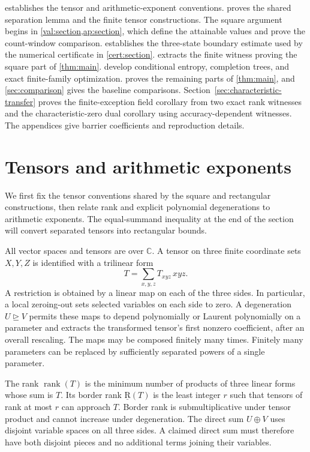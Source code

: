 \documentclass[11pt]{article}
\numberwithin{equation}{section}
\theoremstyle{definition}
\theoremstyle{remark}
\begin{document}
 establishes the tensor and arithmetic-exponent
conventions.   proves the shared separation lemma
and the finite tensor constructions.  The square argument begins in
\cref{val:section,ap:section}, which define the attainable values and
prove the count-window comparison.
 establishes the three-state boundary
estimate used by the numerical certificate in \cref{cert:section}.
 extracts the finite
witness proving the square part of \cref{thm:main}.
 develop conditional
entropy, completion trees, and exact finite-family optimization.
 proves the remaining parts of
\cref{thm:main}, and \cref{sec:comparison} gives the baseline
comparisons.  Section~\ref{sec:characteristic-transfer} proves the
finite-exception field corollary from two exact rank witnesses and
the characteristic-zero dual corollary using accuracy-dependent witnesses.
The appendices give barrier coefficients and reproduction details.

\section{Tensors and arithmetic exponents}\label{sec:preliminaries}

We first fix the tensor conventions shared by the square and rectangular
constructions, then relate rank and explicit polynomial degenerations to
arithmetic exponents.  The equal-summand inequality at the end of the
section will convert separated tensors into rectangular bounds.

All vector spaces and tensors are over \(\mathbb C\).  A tensor on three finite
coordinate sets \(X,Y,Z\) is identified with a trilinear form
\[
 T=\sum_{x,y,z}T_{xyz}\,x y z.
\]
A restriction is obtained by a linear map on each of the three sides.
In particular, a local zeroing-out sets selected variables on each side
to zero.  A degeneration \(U\unrhd V\) permits these maps to depend
polynomially or Laurent polynomially on a parameter and extracts the
transformed tensor's first nonzero coefficient, after an overall rescaling.
The maps may be composed finitely many times.
Finitely many parameters can be replaced by sufficiently separated powers
of a single parameter.

The rank \(\operatorname{rank}(T)\) is the minimum number of products of three linear
forms whose sum is \(T\).  Its border rank \(\operatorname{\underline R}(T)\) is the least
integer \(r\) such that tensors of rank at most \(r\) can approach
\(T\).  Border rank is submultiplicative under tensor product and cannot
increase under degeneration.  The direct sum \(U\oplus V\) uses
disjoint variable spaces on all three sides.  A claimed direct sum must
therefore have both disjoint pieces and no additional terms joining their
variables.
\end{document}
